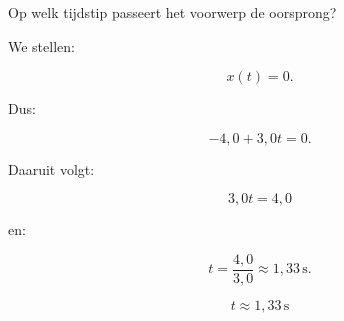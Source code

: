 \documentclass{ximera}
\begin{document}
\begin{oefening}{\oefB}
  
  \begin{question}
  Op welk tijdstip passeert het voorwerp de oorsprong?
  
  \begin{oplossing}
  We stellen:
  
  \[
  x(t)=0.
  \]
  
  Dus:
  
  \[
  -4{,}0+3{,}0t=0.
  \]
  
  Daaruit volgt:
  
  \[
  3{,}0t=4{,}0
  \]
  
  en:
  
  \[
  t=\frac{4{,}0}{3{,}0}
  \approx1{,}33\,\mathrm{s}.
  \]
  
  \[
  \boxed{t\approx1{,}33\,\mathrm{s}}
  \]
  \end{oplossing}
  \end{question}
  
  \end{oefening}
  
  
  
  
\end{document}
